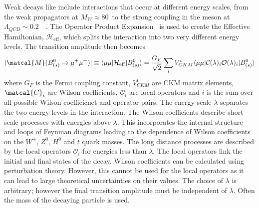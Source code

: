 {{Weak decays like \bmumu include interactions that occur at different energy scales, from the weak propagators at $M_W \approx 80$~\gevcc to the strong coupling in the \bsd meson at $\Lambda_{QCD} \sim 0.2$~\gev~\cite{Olive:2016xmw}. %
The Operator Product Expansion~\cite{PhysRev.179.1499,Wilson1972} is used to create the Effective Hamiltonian, $\mathcal{H}_{\mathrm{eff}}$, which splits the interaction into two very different energy levels. The transition amplitude then becomes 
\begin{equation}
|\matcal{M}(B^0_{(s)} \to \mu^+ \mu^-)| \equiv \langle \mu \mu | \mathcal{H}_{\mathrm{eff}} | B^0_{(s)} \rangle  = \frac{G_F}{\sqrt{2}} \displaystyle\sum_{i} V^i_{CKM} \langle \mu \mu | \mathcal{C}(\lambda)_i \mathcal{O}(\lambda)_i | B^0_{(s)} \rangle
\label{sec:eff_hamil_def}
\end{equation}
where $G_F$ is the Fermi coupling constant, $V_{CKM}^i$ are CKM matrix elements, $\matcal{C}_i$ are Wilson coefficients, $\mathcal{O}_i$ are local operators and $i$ is the sum over all possible Wilson coeffieicnet and operator pairs. The energy scale $\lambda$ separates the two energy levels in the interaction. The Wilson coefficients describe short scale processes with energies above $\lambda$. This incorporates the internal structure and loops of Feynman diagrams leading to the dependence of Wilson coefficients on the $W^{\pm}$, $Z^0$, $H^0$ and $t$ quark masses. The long distance processes are described by the local operators $\mathcal{O}_i$ for energies less than $\lambda$. The local operators link the initial and final states of the decay. %
Wilson coefficients can be calculated using perturbation theory. However, this cannot be used for the local operators as it can lead to large theoretical uncertainties on their values. The choice of $\lambda$ is arbitrary; however the final transition amplitude must be independent of $\lambda$. Often the mass of the decaying particle is used. 

}}
